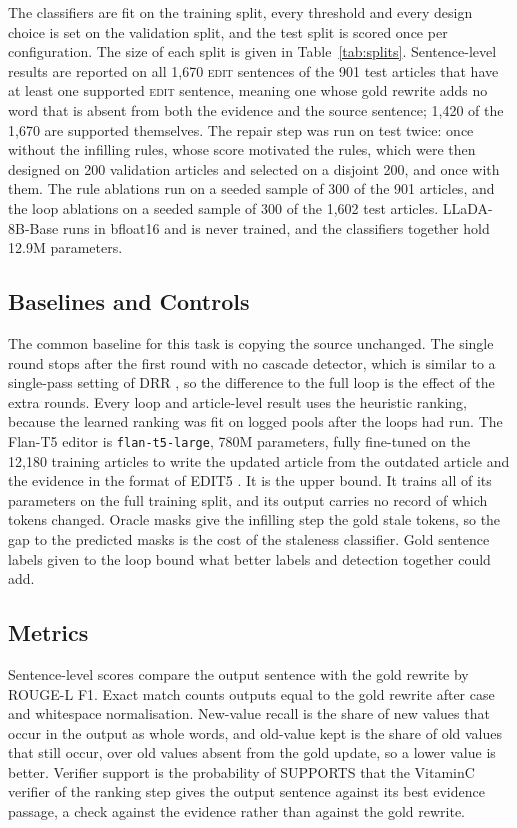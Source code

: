 \documentclass[11pt]{article}
\newcommand{\edit}{\textsc{edit}}
\begin{document}
The classifiers are fit on the training split, every threshold and every design choice is set on the validation split, and the test split is scored once per configuration. The size of each split is given in Table~\ref{tab:splits}. Sentence-level results are reported on all 1,670 \edit{} sentences of the 901 test articles that have at least one supported \edit{} sentence, meaning one whose gold rewrite adds no word that is absent from both the evidence and the source sentence; 1,420 of the 1,670 are supported themselves. The repair step was run on test twice: once without the infilling rules, whose score motivated the rules, which were then designed on 200 validation articles and selected on a disjoint 200, and once with them. The rule ablations run on a seeded sample of 300 of the 901 articles, and the loop ablations on a seeded sample of 300 of the 1,602 test articles. LLaDA-8B-Base runs in bfloat16 and is never trained, and the classifiers together hold 12.9M parameters.

\subsection{Baselines and Controls}
The common baseline for this task is copying the source unchanged. The single round stops after the first round with no cascade detector, which is similar to a single-pass setting of DRR \citep{zou-etal-2026-detect}, so the difference to the full loop is the effect of the extra rounds. Every loop and article-level result uses the heuristic ranking, because the learned ranking was fit on logged pools after the loops had run. The Flan-T5 editor is \texttt{flan-t5-large}, 780M parameters, fully fine-tuned on the 12,180 training articles to write the updated article from the outdated article and the evidence in the format of EDIT5 \citep{iv-etal-2022-fruit}. It is the upper bound. It trains all of its parameters on the full training split, and its output carries no record of which tokens changed. Oracle masks give the infilling step the gold stale tokens, so the gap to the predicted masks is the cost of the staleness classifier. Gold sentence labels given to the loop bound what better labels and detection together could add.

\subsection{Metrics}
Sentence-level scores compare the output sentence with the gold rewrite by ROUGE-L F1. Exact match counts outputs equal to the gold rewrite after case and whitespace normalisation. New-value recall is the share of new values that occur in the output as whole words, and old-value kept is the share of old values that still occur, over old values absent from the gold update, so a lower value is better. Verifier support is the probability of SUPPORTS that the VitaminC verifier of the ranking step gives the output sentence against its best evidence passage, a check against the evidence rather than against the gold rewrite.
\end{document}
